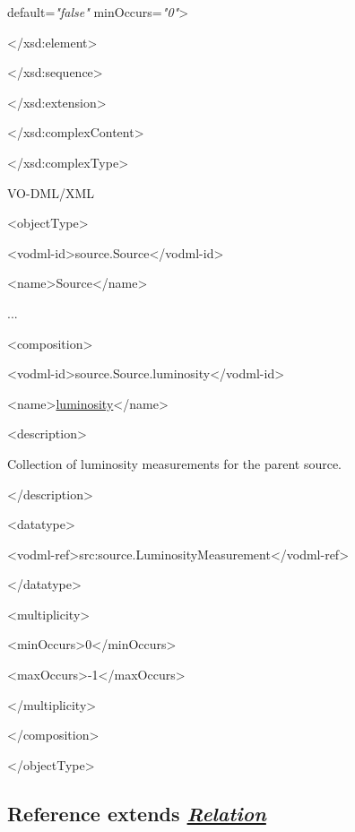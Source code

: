 \documentclass[10pt,a4paper]{ivoa}
\begin{document}
default=\emph{"false"} minOccurs=\emph{"0"}\textgreater{}

\textless/xsd:element\textgreater{}

\textless/xsd:sequence\textgreater{}

\textless/xsd:extension\textgreater{}

\textless/xsd:complexContent\textgreater{}

\textless/xsd:complexType\textgreater{}

VO-DML/XML

\textless objectType\textgreater{}

\textless vodml-id\textgreater source.Source\textless/vodml-id\textgreater{}

\textless name\textgreater Source\textless/name\textgreater{}

...

\textless composition\textgreater{}

\textless vodml-id\textgreater source.Source.luminosity\textless/vodml-id\textgreater{}

\textless name\textgreater{}\uline{luminosity}\textless/name\textgreater{}

\textless description\textgreater{}

Collection of luminosity measurements for the parent source.

\textless/description\textgreater{}

\textless datatype\textgreater{}

\textless vodml-ref\textgreater src:source.LuminosityMeasurement\textless/vodml-ref\textgreater{}

\textless/datatype\textgreater{}

\textless multiplicity\textgreater{}

\textless minOccurs\textgreater0\textless/minOccurs\textgreater{}

\textless maxOccurs\textgreater-1\textless/maxOccurs\textgreater{}

\textless/multiplicity\textgreater{}

\textless/composition\textgreater{}

\textless/objectType\textgreater{}

\hypertarget{reference-extends-relation}{%
\subsection{\texorpdfstring{Reference extends
\protect\hyperlink{semanticconcept}{\emph{Relation}}}{Reference extends Relation}}\label{reference-extends-relation}}
\end{document}
